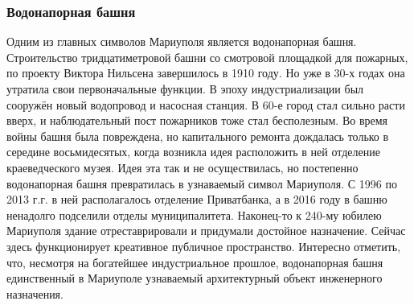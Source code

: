  
 
 
 
 

\subsubsection{Водонапорная башня}

Одним из главных символов Мариуполя является водонапорная башня. Строительство
тридцатиметровой башни со смотровой площадкой для пожарных, по проекту Виктора
Нильсена завершилось в 1910 году. Но уже в 30-х годах она утратила свои
первоначальные функции. В эпоху индустриализации был сооружён новый водопровод
и насосная станция. В 60-е город стал сильно расти вверх, и наблюдательный пост
пожарников тоже стал бесполезным. Во время войны башня была повреждена, но
капитального ремонта дождалась только в середине восьмидесятых, когда возникла
идея расположить в ней отделение краеведческого музея. Идея эта так и не
осуществилась, но постепенно водонапорная башня превратилась в узнаваемый
символ Мариуполя. С 1996 по 2013 г.г. в ней располагалось отделение
Приватбанка, а в 2016 году в башню ненадолго подселили отделы муниципалитета.
Наконец-то к 240-му юбилею Мариуполя здание отреставрировали и придумали
достойное назначение. Сейчас здесь функционирует креативное публичное
пространство. Интересно отметить, что, несмотря на богатейшее индустриальное
прошлое, водонапорная башня единственный в Мариуполе узнаваемый архитектурный
объект инженерного назначения.


